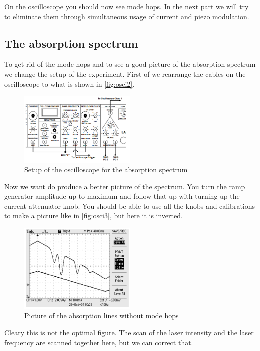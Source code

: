 On the oscilloscope you should now see mode hops.
In the next part we will try to eliminate them through simultaneous usage of current and piezo modulation.

\subsection{The absorption spectrum}
\label{ssec:exe3}

To get rid of the mode hops and to see a good picture of the absorption spectrum we change the setup of the experiment. 
First of we rearrange the cables on the oscilloscope to what is shown in \autoref{fig:osci2}.
\begin{figure}
    \centering
    \includegraphics[width=0.5\textwidth]{images/generator2.png}
    \caption{Setup of the oscilloscope for the absorption spectrum \cite{V60}}
    \label{fig:osci2}
\end{figure}
Now we want do produce a better picture of the spectrum. 
You turn the ramp generator amplitude up to maximum and follow that up with turning up the current attenuator knob.
You should be able to use all the knobs and calibrations to make a picture like in \autoref{fig:osci3}, but here it is inverted.
\begin{figure}
    \centering
    \includegraphics[width=0.5\textwidth]{images/oszi.png}
    \caption{Picture of the absorption lines without mode hops \cite{V60}}
    \label{fig:osci3}
\end{figure}
Cleary this is not the optimal figure.
The scan of the laser intensity and the laser frequency are scanned together here, but we can correct that.
